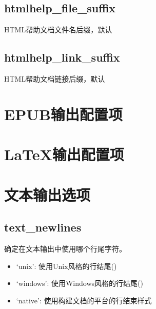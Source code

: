 \documentclass[a4paper,10pt,english]{sphinxmanual}
\begin{document}
\subsection{htmlhelp\_file\_suffix}
\label{\detokenize{sphinx_conf:htmlhelp-file-suffix}}
\sphinxAtStartPar
HTML帮助文档文件名后缀，默认 


\subsection{htmlhelp\_link\_suffix}
\label{\detokenize{sphinx_conf:htmlhelp-link-suffix}}
\sphinxAtStartPar
HTML帮助文档链接后缀，默认 


\section{EPUB输出配置项}
\label{\detokenize{sphinx_conf:epub}}
\sphinxAtStartPar
{}


\section{LaTeX输出配置项}
\label{\detokenize{sphinx_conf:latex}}
\sphinxAtStartPar
{}


\section{文本输出选项}
\label{\detokenize{sphinx_conf:id9}}

\subsection{text\_newlines}
\label{\detokenize{sphinx_conf:text-newlines}}
\sphinxAtStartPar
确定在文本输出中使用哪个行尾字符。
\begin{itemize}
\item {} 
\sphinxAtStartPar
‘unix’: 使用Unix风格的行结尾()

\item {} 
\sphinxAtStartPar
‘windows’: 使用Windows风格的行结尾()

\item {} 
\sphinxAtStartPar
‘native’: 使用构建文档的平台的行结束样式

\end{itemize}
\end{document}
